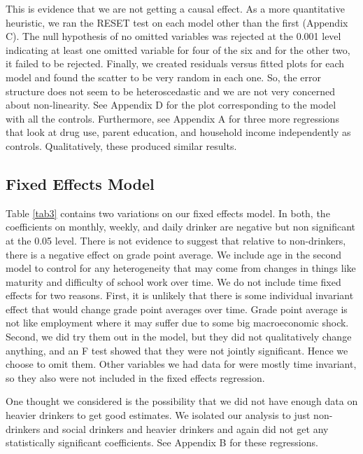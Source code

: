 \documentclass[11pt]{article}
\begin{document}


This is evidence that we are not getting a causal effect. As a more quantitative heuristic, we ran the RESET test on each model other than the first (Appendix C). The null hypothesis of no omitted variables was rejected at the 0.001 level indicating at least one omitted variable for four of the six and for the other two, it failed to be rejected. Finally, we created residuals versus fitted plots for each model and found the scatter to be very random in each one. So, the error structure does not seem to be heteroscedastic and we are not very concerned about non-linearity. See Appendix D for the plot corresponding to the model with all the controls. Furthermore, see Appendix A for three more regressions that look at drug use, parent education, and household income independently as controls. Qualitatively, these produced similar results.

\subsection*{Fixed Effects Model}

Table \ref{tab3} contains two variations on our fixed effects model. In both, the coefficients on monthly, weekly, and daily drinker are negative but non significant at the 0.05 level. There is not evidence to suggest that relative to non-drinkers, there is a negative effect on grade point average. We include age in the second model to control for any heterogeneity that may come from changes in things like maturity and difficulty of school work over time. We do not include time fixed effects for two reasons. First, it is unlikely that there is some individual invariant effect that would change grade point averages over time. Grade point average is not like employment where it may suffer due to some big macroeconomic shock. Second, we did try them out in the model, but they did not qualitatively change anything, and an F test showed that they were not jointly significant. Hence we choose to omit them. Other variables we had data for were mostly time invariant, so they also were not included in the fixed effects regression. 

One thought we considered is the possibility that we did not have enough data on heavier drinkers to get good estimates. We isolated our analysis to just non-drinkers and social drinkers and heavier drinkers and again did not get any statistically significant coefficients. See Appendix B for these regressions. 
\end{document}
